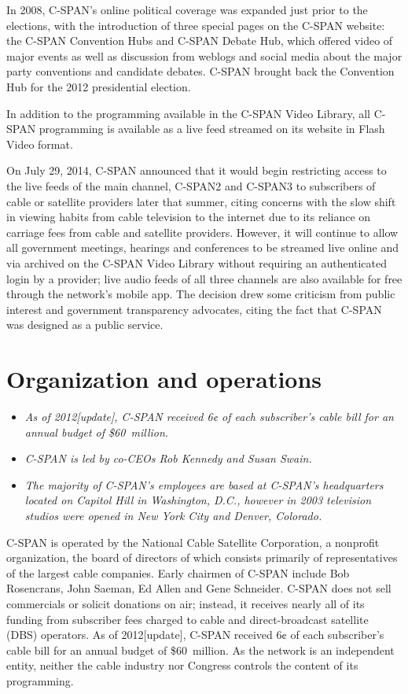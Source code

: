 In 2008, C-SPAN's online political coverage was expanded just prior to
the elections, with the introduction of three special pages on the
C-SPAN website: the C-SPAN Convention Hubs and C-SPAN Debate Hub, which
offered video of major events as well as discussion from weblogs and
social media about the major party conventions and candidate debates.
C-SPAN brought back the Convention Hub for the 2012 presidential
election.

In addition to the programming available in the C-SPAN Video Library,
all C-SPAN programming is available as a live feed streamed on its
website in Flash Video format.

On July 29, 2014, C-SPAN announced that it would begin restricting
access to the live feeds of the main channel, C-SPAN2 and C-SPAN3 to
subscribers of cable or satellite providers later that summer, citing
concerns with the slow shift in viewing habits from cable television to
the internet due to its reliance on carriage fees from cable and
satellite providers. However, it will continue to allow all government
meetings, hearings and conferences to be streamed live online and via
archived on the C-SPAN Video Library without requiring an authenticated
login by a provider; live audio feeds of all three channels are also
available for free through the network's mobile app. The decision drew
some criticism from public interest and government transparency
advocates, citing the fact that C-SPAN was designed as a public service.

\section{Organization and operations}\label{organization-and-operations}

\begin{itemize}
\item
  \emph{As of 2012{[}update{]}, C-SPAN received 6¢ of each subscriber's
  cable bill for an annual budget of \$60~million.}
\item
  \emph{C-SPAN is led by co-CEOs Rob Kennedy and Susan Swain.}
\item
  \emph{The majority of C-SPAN's employees are based at C-SPAN's
  headquarters located on Capitol Hill in Washington, D.C., however in
  2003 television studios were opened in New York City and Denver,
  Colorado.}
\end{itemize}

C-SPAN is operated by the National Cable Satellite Corporation, a
nonprofit organization, the board of directors of which consists
primarily of representatives of the largest cable companies. Early
chairmen of C-SPAN include Bob Rosencrans, John Saeman, Ed Allen and
Gene Schneider. C-SPAN does not sell commercials or solicit donations on
air; instead, it receives nearly all of its funding from subscriber fees
charged to cable and direct-broadcast satellite (DBS) operators. As of
2012{[}update{]}, C-SPAN received 6¢ of each subscriber's cable bill for
an annual budget of \$60~million. As the network is an independent
entity, neither the cable industry nor Congress controls the content of
its programming.

